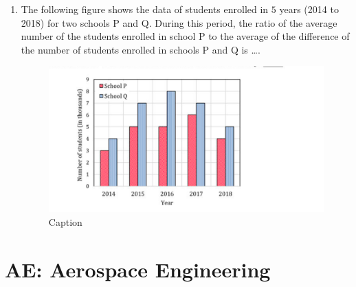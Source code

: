 \documentclass[journal,12pt,onecolumn]{IEEEtran}
\theoremstyle{remark}
\begin{document}
\begin{enumerate}
\item The following figure shows the data of students enrolled in $5$ years (2014 to 2018) for two schools P and Q. During this period, the ratio of the average number of the students enrolled in school P to the average of the difference of the number of students enrolled in schools P and Q is \dots.
\begin{figure}[H]
    \centering
    \includegraphics[width=0.5\columnwidth]{figs/Screenshot from 2025-08-17 15-29-33.png}
    \caption{Caption}
    \label{fig:placeholder}
\end{figure}
\begin{enumerate}
\end{enumerate}
\end{enumerate}

\section{AE: Aerospace Engineering}
\end{document}
